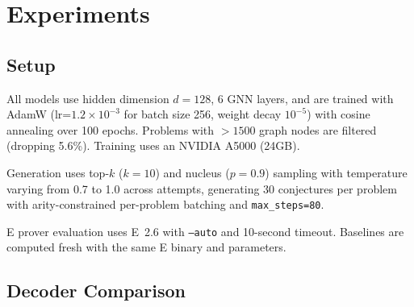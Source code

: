 \documentclass{article}
\begin{document}
\section{Experiments}
\label{sec:experiments}

\subsection{Setup}

All models use hidden dimension $d{=}128$, 6 GNN layers, and are trained with
AdamW (lr=$1.2{\times}10^{-3}$ for batch size 256, weight decay $10^{-5}$) with
cosine annealing over 100 epochs. Problems with $>1500$ graph nodes are filtered
(dropping 5.6\%). Training uses an NVIDIA A5000 (24GB).

Generation uses top-$k$ ($k{=}10$) and nucleus ($p{=}0.9$) sampling with temperature
varying from 0.7 to 1.0 across attempts, generating 30 conjectures per problem with
arity-constrained per-problem batching and \texttt{max\_steps=80}.

E prover evaluation uses E~2.6 with \texttt{--auto} and 10-second timeout.
Baselines are computed fresh with the same E binary and parameters.

\subsection{Decoder Comparison}
\end{document}
